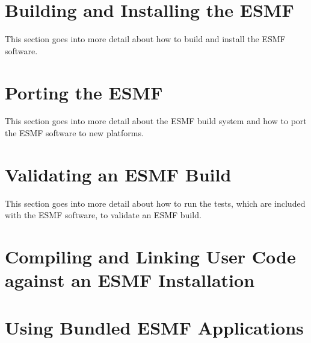 
\setlength{\parskip}{1.5ex}
\setlength{\parindent}{0em}


\section{Building and Installing the ESMF}
\label{sec:TechOver}

This section goes into more detail about how to build and install the ESMF
software.




\section{Porting the ESMF}
\label{sec:TechOverPort}

This section goes into more detail about the ESMF build system and how to
port the ESMF software to new platforms.




\section{Validating an ESMF Build}
\label{sec:TechOver2}

This section goes into more detail about how to run the tests, which are
included with the ESMF software, to validate an ESMF build.




\newpage
\section{Compiling and Linking User Code against an ESMF Installation}
\label{sec:Use}



\newpage
\section{Using Bundled ESMF Applications}
\label{sec:Apps}




%

